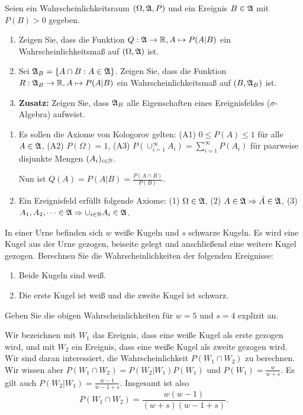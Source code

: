 Seien ein Wahrscheinlichkeitsraum $(\Omega, \mathfrak A, P)$ und ein Ereignis $B\in\mathfrak A$
mit $P(B)>0$ gegeben. 
\begin{enumerate}
    \item Zeigen Sie, dass die Funktion $Q: \mathfrak A \to \mathbb R, A \mapsto P(A|B)$ ein
        Wahrscheinlichkeitsmaß auf $(\Omega, \mathfrak A)$ ist.
    \item Sei $\mathfrak A_B = \left\{ A \cap B : A\in \mathfrak A \right\}$. Zeigen Sie, dass
        die Funktion $R: \mathfrak A_B \to \mathbb R, A \mapsto P(A|B)$ ein Wahrscheinlichkeitsmaß
        auf $\left( B, \mathfrak A_B \right)$ ist. 
    \item \textbf{Zusatz:} Zeigen Sie, dass $\mathfrak A_B$ alle Eigenschaften eines Ereignisfeldes ($\sigma$-Algebra) aufweist.
\end{enumerate}

\solution
\begin{enumerate}
    \item Es sollen die Axiome von Kologorov gelten: (A1) $0 \leq P(A) \leq 1$
        für alle $A\in \mathfrak A$, (A2) $P(\Omega)=1$, (A3) $P\left(
        \cup_{i=1}^{\infty} A_i \right) = \sum_{i=1}^{\infty} P(A_i)$ für
        paarweise disjunkte Mengen $(A_i)_{i\in \mathbb N}$. 

        Nun ist $Q(A) = P( A | B) =  \frac{P(A \cap B)}{ P(B)}$.

    \item Ein Ereignisfeld erfüllt folgende Axiome: (1) $\Omega \in \mathfrak A$, (2)
        $A \in \mathfrak A \Rightarrow \bar A \in \mathfrak A$, (3) $A_1, A_2, \dots \in \mathfrak A \Rightarrow
        \cup_{i\in\mathbb N} A_i \in \mathfrak A$. 
\end{enumerate}


 In einer Urne
befinden sich $w$ weiße Kugeln und $s$ schwarze Kugeln. Es wird eine Kugel aus
der Urne gezogen, beiseite gelegt und anschließend eine weitere Kugel gezogen.
Berechnen Sie die Wahrscheinlichkeiten der folgenden Ereignisse:
\begin{enumerate}
    \item Beide Kugeln sind weiß.
    \item Die erste Kugel ist weiß und die zweite Kugel ist schwarz.
\end{enumerate}
Geben Sie die obigen Wahrscheinlichkeiten für $w=5$ und $s=4$ explizit an.

\solution Wir bezeichnen mit $W_1$ das Ereignis, dass eine weiße Kugel als
erste gezogen wird, und mit $W_2$ ein Ereignis, dass eine weiße Kugel als zweite
gezogen wird. Wir sind daran interessiert, die Wahrscheinlichkeit $P(W_1 \cap W_2)$ zu
berechnen. Wir wissen aber $P(W_1 \cap W_2) = P(W_2 | W_1) P(W_1)$ und
$P(W_1) = \frac{w}{w+s}$. Es gilt auch $P(W_2 | W_1) = \frac{w-1}{w-1+s}$.
Insgesamt ist also \begin{equation*}
    P(W_1 \cap W_2) = \frac{w(w-1)}{(w+s)(w-1+s) }.
\end{equation*}

